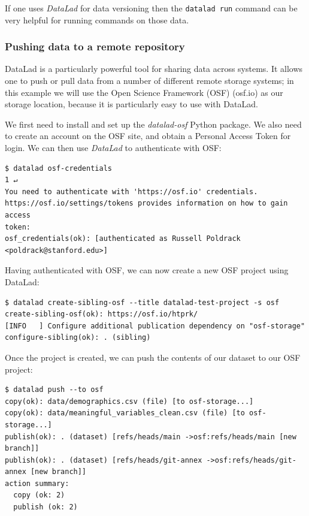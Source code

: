 If one uses \textit{DataLad} for data versioning then the \texttt{datalad run} command can be very helpful for running commands on those data.

\subsubsection{Pushing data to a remote repository}

DataLad is a particularly powerful tool for sharing data across systems.  It allows one to push or pull data from a number of different remote storage systems; in this example we will use the Open Science Framework (OSF) (osf.io) as our storage location, because it is particularly easy to use with DataLad.

We first need to install and set up the \textit{datalad-osf} Python package.  We also need to create an account on the OSF site, and obtain a Personal Access Token for login.  We can then use \textit{DataLad} to authenticate with OSF:

\begin{lstlisting}[style=shellshort]
$ datalad osf-credentials                                                1 ↵
You need to authenticate with 'https://osf.io' credentials. https://osf.io/settings/tokens provides information on how to gain access
token:
osf_credentials(ok): [authenticated as Russell Poldrack <poldrack@stanford.edu>]
\end{lstlisting}

Having authenticated with OSF, we can now create a new OSF project using DataLad:

\begin{lstlisting}[style=shellshort]
$ datalad create-sibling-osf --title datalad-test-project -s osf
create-sibling-osf(ok): https://osf.io/htprk/
[INFO   ] Configure additional publication dependency on "osf-storage"
configure-sibling(ok): . (sibling)
\end{lstlisting}

Once the project is created, we can push the contents of our dataset to our OSF project:

\begin{lstlisting}[style=shell]
$ datalad push --to osf
copy(ok): data/demographics.csv (file) [to osf-storage...]
copy(ok): data/meaningful_variables_clean.csv (file) [to osf-storage...]
publish(ok): . (dataset) [refs/heads/main ->osf:refs/heads/main [new branch]]
publish(ok): . (dataset) [refs/heads/git-annex ->osf:refs/heads/git-annex [new branch]]
action summary:
  copy (ok: 2)
  publish (ok: 2)
\end{lstlisting}

